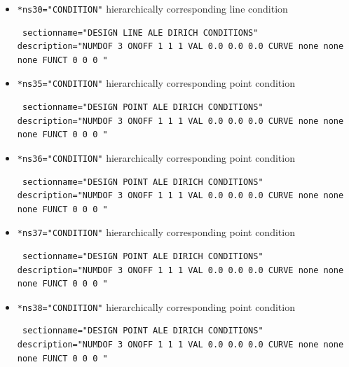 \begin{itemize}
\item \verb|*ns30="CONDITION"| \qquad hierarchically corresponding line condition
\begin{small} \begin{verbatim} sectionname="DESIGN LINE ALE DIRICH CONDITIONS"
description="NUMDOF 3 ONOFF 1 1 1 VAL 0.0 0.0 0.0 CURVE none none none FUNCT 0 0 0 "
\end{verbatim} \end{small}

 \item \verb|*ns35="CONDITION"| \qquad hierarchically corresponding point condition
\begin{small} \begin{verbatim} sectionname="DESIGN POINT ALE DIRICH CONDITIONS"
description="NUMDOF 3 ONOFF 1 1 1 VAL 0.0 0.0 0.0 CURVE none none none FUNCT 0 0 0 "
\end{verbatim} \end{small}

 \item \verb|*ns36="CONDITION"| \qquad hierarchically corresponding point condition
\begin{small} \begin{verbatim} sectionname="DESIGN POINT ALE DIRICH CONDITIONS"
description="NUMDOF 3 ONOFF 1 1 1 VAL 0.0 0.0 0.0 CURVE none none none FUNCT 0 0 0 "
\end{verbatim} \end{small}

 \item \verb|*ns37="CONDITION"| \qquad hierarchically corresponding point condition
\begin{small} \begin{verbatim} sectionname="DESIGN POINT ALE DIRICH CONDITIONS"
description="NUMDOF 3 ONOFF 1 1 1 VAL 0.0 0.0 0.0 CURVE none none none FUNCT 0 0 0 "
\end{verbatim} \end{small} 

\item \verb|*ns38="CONDITION"| \qquad hierarchically corresponding point condition
\begin{small} \begin{verbatim} sectionname="DESIGN POINT ALE DIRICH CONDITIONS"
description="NUMDOF 3 ONOFF 1 1 1 VAL 0.0 0.0 0.0 CURVE none none none FUNCT 0 0 0 "
\end{verbatim} \end{small}

\end{itemize}


